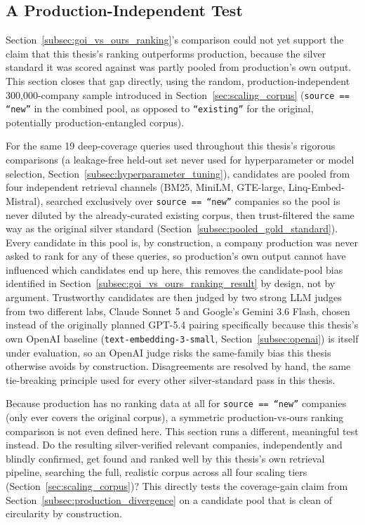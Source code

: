 \documentclass[a4paper,oneside,bibliography=totoc]{scrbook}
\begin{document}
\subsection{A Production-Independent Test}
\label{subsec:production_independent_eval}

Section~\ref{subsec:goi_vs_ours_ranking}'s comparison could not yet support the claim that this thesis's ranking outperforms production, because the silver standard it was scored against was partly pooled from production's own output. This section closes that gap directly, using the random, production-independent 300{,}000-company sample introduced in Section~\ref{sec:scaling_corpus} (\texttt{source == ``new''} in the combined pool, as opposed to \texttt{``existing''} for the original, potentially production-entangled corpus).

For the same 19 deep-coverage queries used throughout this thesis's rigorous comparisons (a leakage-free held-out set never used for hyperparameter or model selection, Section~\ref{subsec:hyperparameter_tuning}), candidates are pooled from four independent retrieval channels (BM25, MiniLM, GTE-large, Linq-Embed-Mistral), searched exclusively over \texttt{source == ``new''} companies so the pool is never diluted by the already-curated existing corpus, then trust-filtered the same way as the original silver standard (Section~\ref{subsec:pooled_gold_standard}). Every candidate in this pool is, by construction, a company production was never asked to rank for any of these queries, so production's own output cannot have influenced which candidates end up here, this removes the candidate-pool bias identified in Section~\ref{subsec:goi_vs_ours_ranking_result} by design, not by argument. Trustworthy candidates are then judged by two strong LLM judges from two different labs, Claude Sonnet 5 and Google's Gemini 3.6 Flash, chosen instead of the originally planned GPT-5.4 pairing specifically because this thesis's own OpenAI baseline (\texttt{text-embedding-3-small}, Section~\ref{subsec:openai}) is itself under evaluation, so an OpenAI judge risks the same-family bias this thesis otherwise avoids by construction. Disagreements are resolved by hand, the same tie-breaking principle used for every other silver-standard pass in this thesis.

Because production has no ranking data at all for \texttt{source == ``new''} companies (only ever covers the original corpus), a symmetric production-vs-ours ranking comparison is not even defined here. This section runs a different, meaningful test instead. Do the resulting silver-verified relevant companies, independently and blindly confirmed, get found and ranked well by this thesis's own retrieval pipeline, searching the full, realistic corpus across all four scaling tiers (Section~\ref{sec:scaling_corpus})? This directly tests the coverage-gain claim from Section~\ref{subsec:production_divergence} on a candidate pool that is clean of circularity by construction.
\end{document}
